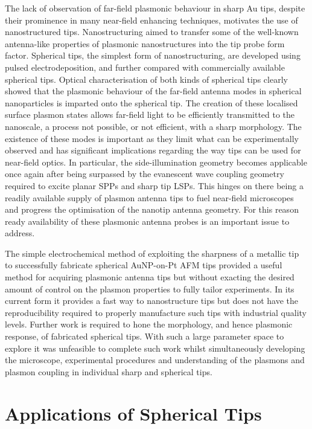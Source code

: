 \documentclass[12pt, a4paper, twoside]{book}
\begin{document}
The lack of observation of far-field plasmonic behaviour in sharp Au tips, despite their prominence in many near-field enhancing techniques, motivates the use of nanostructured tips. Nanostructuring aimed to transfer some of the well-known antenna-like properties of plasmonic nanostructures into the tip probe form factor. Spherical tips, the simplest form of nanostructuring, are developed using pulsed electrodeposition, and further compared with commercially available spherical tips.
Optical characterisation of both kinds of spherical tips clearly showed that the plasmonic behaviour of the far-field antenna modes in spherical nanoparticles is imparted onto the spherical tip. The creation of these localised surface plasmon states allows far-field light to be efficiently transmitted to the nanoscale, a process not possible{\color{red}, or not efficient,} with a sharp morphology. The existence of these modes is important as they limit what can be experimentally observed and has significant implications regarding the way tips can be used for near-field optics. In particular, the side-illumination geometry becomes applicable once again after being surpassed by the evanescent wave coupling geometry required to excite planar SPPs and sharp tip LSPs. This hinges on there being a readily available supply of plasmon antenna tips to fuel near-field microscopes and progress the optimisation of the nanotip antenna geometry. For this reason ready availability of these plasmonic antenna probes is an important issue to address.

The simple electrochemical method of exploiting the sharpness of a metallic tip to successfully fabricate spherical AuNP-on-Pt AFM tips provided a useful method for acquiring plasmonic antenna tips but without exacting the desired amount of control on the plasmon properties to fully tailor experiments. In its current form it provides a fast way to nanostructure tips but does not have the reproducibility required to properly manufacture such tips with industrial quality levels. Further work is required to hone the morphology, and hence plasmonic response, of fabricated spherical tips. With such a large parameter space to explore it was unfeasible to complete such work whilst simultaneously developing the microscope, experimental procedures and understanding of the plasmons and plasmon coupling in individual sharp and spherical tips.

\section{Applications of Spherical Tips}
\end{document}
